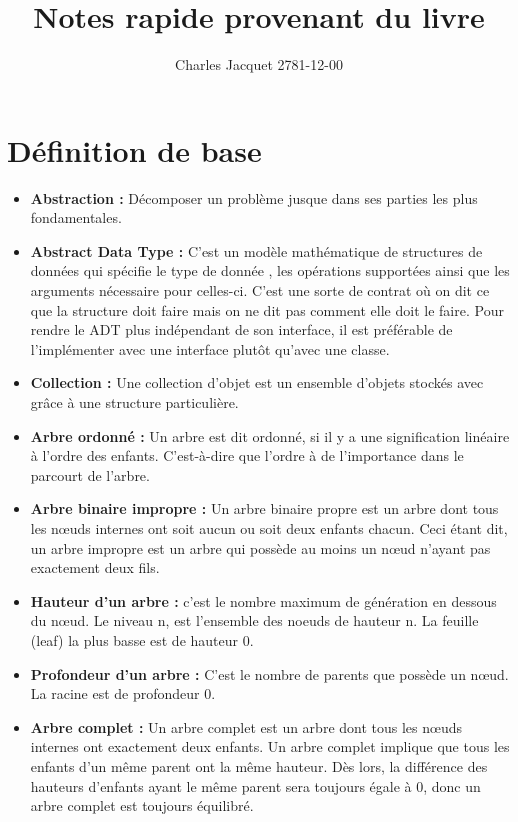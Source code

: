 \documentclass[a4paper]{article}
\title{Notes rapide provenant du livre}
\author{Charles Jacquet 2781-12-00}
\begin{document}
\maketitle

\section{Définition de base}
\begin{itemize}
\item \textbf{Abstraction : }Décomposer un problème jusque dans ses parties les plus fondamentales.

\item \textbf{Abstract Data Type : } C'est un modèle mathématique de structures de données qui spécifie le type de donnée , les opérations supportées ainsi que les arguments nécessaire pour celles-ci. C'est une sorte de contrat où on dit ce que la structure doit faire mais on ne dit pas comment elle doit le faire.
Pour rendre le ADT plus indépendant de son interface, il est préférable de l'implémenter avec une interface plutôt qu'avec une classe.

\item \textbf{Collection : } Une collection d'objet est un ensemble d'objets stockés avec grâce à une structure particulière.

\item \textbf{Arbre ordonné : } Un arbre est dit ordonné, si il y a une signification linéaire à l'ordre des enfants. C'est-à-dire que l'ordre à de l'importance dans le parcourt de l'arbre.

\item \textbf{Arbre binaire impropre : } Un arbre binaire propre est un arbre dont tous les nœuds internes ont soit aucun ou soit deux enfants chacun. Ceci étant dit, un arbre impropre est un arbre qui possède au moins un nœud n'ayant pas exactement deux fils.

\item \textbf{Hauteur d'un arbre : } c'est le nombre maximum de génération en dessous du nœud. Le niveau n, est l'ensemble des noeuds de hauteur n. La feuille (leaf) la plus basse est de hauteur 0.
\item \textbf{Profondeur d'un arbre : } C'est le nombre de parents que possède un nœud. La racine est de profondeur 0.

\item \textbf{Arbre complet : } Un arbre complet est un arbre dont tous les nœuds internes ont exactement deux enfants. Un arbre complet implique que tous les enfants d'un même parent ont la même hauteur. Dès lors, la différence des hauteurs d'enfants ayant le même parent sera toujours égale à 0, donc un arbre complet est toujours équilibré.


\end{itemize}
\end{document}

